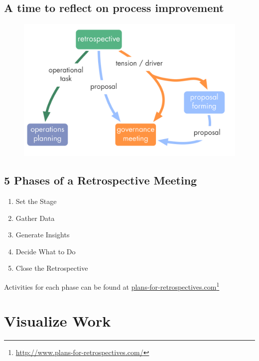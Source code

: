 \subsection{A time to reflect on process improvement}
\label{atimetoreflectonprocessimprovement}

\begin{figure}[htbp]
\centering
\includegraphics[keepaspectratio,width=\textwidth,height=0.75\textheight]{img/meetings/retrospective.png}
\end{figure}

\subsection{5 Phases of a Retrospective Meeting}
\label{5phasesofaretrospectivemeeting}

\begin{enumerate}
\item Set the Stage

\item Gather Data

\item Generate Insights

\item Decide What to Do

\item Close the Retrospective

\end{enumerate}

Activities for each phase can be found at \href{http://www.plans-for-retrospectives.com/}{plans-for-retrospectives.com}\footnote{\href{http://www.plans-for-retrospectives.com/}{http:/\slash www.plans-for-retrospectives.com\slash }}

\section{Visualize Work}
\label{visualizework}

